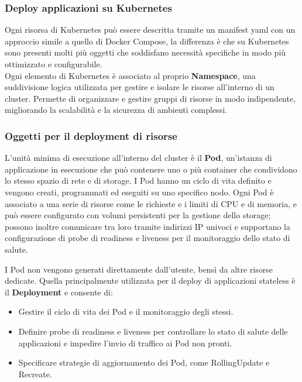 \subsubsection{Deploy applicazioni su Kubernetes}

Ogni risorsa di Kubernetes può essere descritta tramite un manifest yaml con un approccio simile a quello di Docker Compose, la differenza è che su Kubernetes sono presenti molti più oggetti che soddisfano necessità specifiche in modo più ottimizzato e configurabile.\\
Ogni elemento di Kubernetes è associato al proprio \textbf{Namespace}, una suddivisione logica utilizzata per gestire e isolare le risorse all'interno di un cluster. Permette di organizzare e gestire gruppi di risorse in modo indipendente, migliorando la scalabilità e la sicurezza di ambienti complessi.

\subsubsection{Oggetti per il deployment di risorse}

 L'unità minima di esecuzione all'interno del cluster è il \textbf{Pod}, un'istanza di applicazione in esecuzione che può contenere uno o più container che condividono lo stesso spazio di rete e di storage. I Pod hanno un ciclo di vita definito e vengono creati, programmati ed eseguiti su uno specifico nodo. Ogni Pod è associato a una serie di risorse come le richieste e i limiti di CPU e di memoria, e può essere configurato con volumi persistenti per la gestione dello storage; possono inoltre comunicare tra loro tramite indirizzi IP univoci e supportano la configurazione di probe di readiness e liveness per il monitoraggio dello stato di salute.
 
I Pod non vengono generati direttamente dall'utente, bensì da altre risorse dedicate. Quella principalmente utilizzata per il deploy di applicazioni stateless è il \textbf{Deployment} e consente di:
\begin{itemize}
    \item Gestire il ciclo di vita dei Pod e il monitoraggio degli stessi. 
    \item Definire probe di readiness e liveness per controllare lo stato di salute delle applicazioni e impedire l'invio di traffico ai Pod non pronti.
    \item Specificare strategie di aggiornamento dei Pod, come RollingUpdate e Recreate.
    
\end{itemize}

